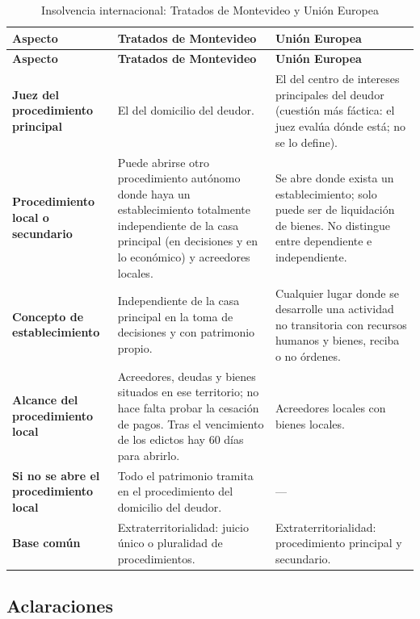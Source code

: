 \documentclass[12pt,oneside]{book}
\begin{document}
\begin{longtable}{L{0.21\textwidth}L{\dimexpr(0.79\tabcolsep)/2\relax}L{\dimexpr(0.79\tabcolsep)/2\relax}}
\caption{Insolvencia internacional: Tratados de Montevideo y Unión Europea}\\
\toprule
\textbf{Aspecto} & \textbf{Tratados de Montevideo} & \textbf{Unión Europea} \\
\midrule
\endfirsthead
\toprule
\textbf{Aspecto} & \textbf{Tratados de Montevideo} & \textbf{Unión Europea} \\
\midrule
\endhead

\textbf{Juez del procedimiento principal} & El del domicilio del deudor. & El del centro de intereses principales del deudor (cuestión más fáctica: el juez evalúa dónde está; no se lo define). \\[0.4em]
\textbf{Procedimiento local o secundario} & Puede abrirse otro procedimiento autónomo donde haya un establecimiento totalmente independiente de la casa principal (en decisiones y en lo económico) y acreedores locales. & Se abre donde exista un establecimiento; solo puede ser de liquidación de bienes. No distingue entre dependiente e independiente. \\[0.4em]
\textbf{Concepto de establecimiento} & Independiente de la casa principal en la toma de decisiones y con patrimonio propio. & Cualquier lugar donde se desarrolle una actividad no transitoria con recursos humanos y bienes, reciba o no órdenes. \\[0.4em]
\textbf{Alcance del procedimiento local} & Acreedores, deudas y bienes situados en ese territorio; no hace falta probar la cesación de pagos. Tras el vencimiento de los edictos hay 60 días para abrirlo. & Acreedores locales con bienes locales. \\[0.4em]
\textbf{Si no se abre el procedimiento local} & Todo el patrimonio tramita en el procedimiento del domicilio del deudor. & --- \\[0.4em]
\textbf{Base común} & Extraterritorialidad: juicio único o pluralidad de procedimientos. & Extraterritorialidad: procedimiento principal y secundario. \\
\bottomrule
\end{longtable}

\subsection{Aclaraciones}
\end{document}
